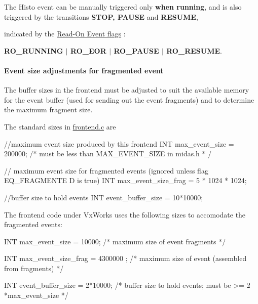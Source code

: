 The Histo event can be manually triggered only {\bfseries when running}, and is also triggered by the transitions {\bfseries STOP, PAUSE} and {\bfseries RESUME}, \par
indicated by the \hyperlink{FE_table_FE_tbl_ReadOn}{Read-\/On Event flags} : \par
 {\bfseries RO\_\-RUNNING $|$ RO\_\-EOR $|$ RO\_\-PAUSE $|$ RO\_\-RESUME}.

\label{FE_eq_event_routines_idx_event_fragmented_size}
\hypertarget{FE_eq_event_routines_idx_event_fragmented_size}{}
 \hypertarget{FE_eq_event_routines_FE_frag_max_event_size}{}\paragraph{Event size adjustments for fragmented event}\label{FE_eq_event_routines_FE_frag_max_event_size}
The buffer sizes in the frontend must be adjusted to suit the available memory for the event buffer (used for sending out the event fragments) and to determine the maximum fragment size.

The standard sizes in \hyperlink{frontend_8c}{frontend.c} are 
\begin{DoxyCode}
    //maximum event size produced by this frontend
    INT max_event_size = 200000; /* must be less than MAX_EVENT_SIZE in midas.h *
      / 

    // maximum event size for fragmented events (ignored unless flag EQ_FRAGMENTE
      D is true) 
    INT max_event_size_frag = 5 * 1024 * 1024;

    //buffer size to hold events
    INT event_buffer_size = 10*10000;
\end{DoxyCode}


The frontend code under VxWorks uses the following sizes to accomodate the fragmented events: 
\begin{DoxyCode}
    INT max_event_size = 10000; /* maximum size of event fragments */

    INT max_event_size_frag = 4300000  ; /* maximum size of event (assembled from
       fragments) */

    INT event_buffer_size = 2*10000; /* buffer size to hold events; must be  >= 2
      *max_event_size  */
\end{DoxyCode}



